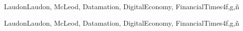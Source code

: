 \begin{syllabus}
\begin{unit}{\SPProfessionalEthics}{}{LaudonLaudon, McLeod, Datamation, DigitalEconomy, FinancialTimes}{4}{f,g,ñ}
\begin{learningoutcomes}
        \item \SPProfessionalEthicsLOInvestigateForms [\Usage]
        \item \SPProfessionalEthicsLOExamine [\Usage]
        \item \SPProfessionalEthicsLOExplainTheErgonomics [\Usage]
        \item \SPProfessionalEthicsLODevelopA [\Familiarity]
        \item \SPProfessionalEthicsLODescribeIssuesIndustries [\Usage]
	\end{learningoutcomes}
\end{unit}

\begin{unit}{\SPIntellectualProperty}{}{LaudonLaudon, McLeod, Datamation, DigitalEconomy, FinancialTimes}{4}{f,g,ñ}
	\begin{topics}
        \item \SPIntellectualPropertyTopicPhilosophical
        \item \SPIntellectualPropertyTopicIntellectual
        \item \SPIntellectualPropertyTopicIntangible
        \item \SPIntellectualPropertyTopicLegal
        \item \SPIntellectualPropertyTopicDigital
        \item \SPIntellectualPropertyTopicCopyrights
        \item \SPIntellectualPropertyTopicPlagiarism
        \item \SPIntellectualPropertyTopicFoundations
        \item \SPIntellectualPropertyTopicSoftware
	\end{topics}


\end{unit}
\end{syllabus}

